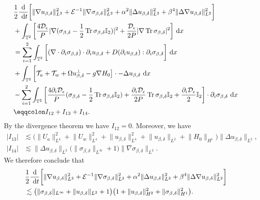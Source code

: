 \documentclass[12pt,a4paper]{article}
\theoremstyle{definition}
\theoremstyle{remark}
\numberwithin{equation}{section}
\newcommand{\dx}{\ {\rm d} {x}}
\newcommand{\dt}{\ {\rm d} t }
\DeclareMathOperator{\Tr}{Tr}
\begin{document}
\begin{align*}
&\frac{1}{2} \frac{\textrm{d}}{\dt} \bigg[ \lVert \nabla u_{\beta,\delta} \rVert_{L^2}^2 + \mathcal{E}^{-1} \lVert \nabla \sigma_{\beta,\delta} \rVert_{L^2}^2 + \alpha^2 \lVert \Delta u_{\beta,\delta} \rVert_{L^2}^2 + \beta^4 \lVert \Delta \nabla u_{\beta,\delta} \rVert_{L^2}^2 \bigg] \\
&+ \int_{\mathbb{T}^2} \bigg[ \frac{4 \mathcal{D}_\epsilon}{P} \lvert \nabla (\sigma_{\beta,\delta} - \frac{1}{2} \Tr \sigma_{\beta,\delta} \mathbb I_2 ) \rvert^2 + \frac{\mathcal{D}_\epsilon}{2 P} \lvert \nabla \Tr \sigma_{\beta,\delta} \rvert^2 \bigg] \dx \\
&= \sum_{i=1}^2 \int_{\mathbb{T}^2} \bigg[ (\nabla \cdot \partial_i \sigma_{\beta,\delta}) \cdot \partial_i u_{\beta,\delta} + D(\partial_i u_{\beta,\delta}) : \partial_i \sigma_{\beta,\delta} \bigg] \dx \\
&+ \int_{\mathbb{T}^2} \bigg[ \mathcal{T}_a + \mathcal{T}_w + \Omega u^\perp_{\beta,\delta} - g \nabla H_0 \big] \cdot - \Delta u_{\beta,\delta} \dx \\
&- \sum_{i=1}^2 \int_{\mathbb{T}^2} \bigg[ \frac{4 \partial_i \mathcal{D}_\epsilon}{P} (\sigma_{\beta,\delta} - \frac{1}{2} \Tr \sigma_{\beta,\delta} \mathbb I_2) + \frac{\partial_i \mathcal{D}_\epsilon}{2 P} \Tr \sigma_{\beta,\delta} \mathbb I_2 + \frac{\partial_i \mathcal{D}_\epsilon}{2} \mathbb I_2 \bigg] \cdot \partial_i \sigma_{\beta,\delta} \dx \\
&\eqqcolon I_{12} + I_{13} + I_{14}.
\end{align*}
By the divergence theorem we have $I_{12} = 0$. Moreover, we have
\begin{align*}
\lvert I_{13} \rvert &\lesssim \big(\lVert U_a \rVert_{L^4}^2 + \lVert U_w \rVert_{L^4}^2 + \lVert u_{\beta,\delta} \rVert_{L^4}^2 + \lVert u_{\beta,\delta} \rVert_{L^2} + \lVert H_0 \rVert_{H^1} \big) \lVert \Delta u_{\beta,\delta} \rVert_{L^2}, \\
\lvert I_{14} \rvert &\lesssim \lVert \Delta u_{\beta,\delta} \rVert_{L^2} \big(\lVert \sigma_{\beta,\delta} \rVert_{L^\infty} + 1\big) \lVert \nabla \sigma_{\beta,\delta} \rVert_{L^2}.
\end{align*}
We therefore conclude that
\begin{align} \nonumber
&\frac{1}{2} \frac{\textrm{d}}{\dt} \bigg[ \lVert \nabla u_{\beta,\delta} \rVert_{L^2}^2 + \mathcal{E}^{-1} \lVert \nabla \sigma_{\beta,\delta} \rVert_{L^2}^2 + \alpha^2 \lVert \Delta u_{\beta,\delta} \rVert_{L^2}^2 + \beta^4 \lVert \Delta \nabla u_{\beta,\delta} \rVert_{L^2}^2 \bigg] \\
&\lesssim \big(\lVert \sigma_{\beta,\delta} \rVert_{L^\infty} + \lVert u_{\beta,\delta} \rVert_{L^2} + 1\big) \big(1 + \lVert u_{\beta,\delta} \rVert_{H^2}^2 + \lVert \sigma_{\beta,\delta} \rVert_{H^1}^2 \big). \label{H1estimate}
\end{align}
\end{document}
